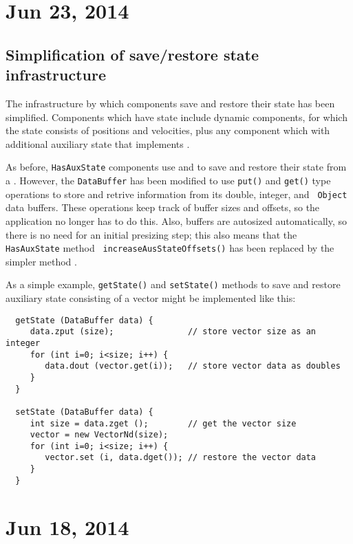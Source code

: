 \documentclass{article}
\begin{document}
\section*{Jun 23, 2014}

\subsection*{Simplification of save/restore state infrastructure}

The infrastructure by which components save and restore their state
has been simplified. Components which have state include dynamic
components, for which the state consists of positions and velocities,
plus any component which with additional auxiliary state that
implements .

As before, {\tt HasAuxState} components use
 and
 to save
and restore their state from a
. However, the {\tt DataBuffer}
has been modified to use {\tt put()} and {\tt get()} type operations
to store and retrive information from its double, integer, and {\tt
Object} data buffers. These operations keep track of buffer sizes and
offsets, so the application no longer has to do this. Also, buffers
are autosized automatically, so there is no need for an initial
presizing step; this also means that the {\tt HasAuxState} method {\tt
increaseAusStateOffsets()} has been replaced by the simpler method
.

As a simple example, {\tt getState()} and {\tt setState()} methods to
save and restore auxiliary state consisting of a vector might be
implemented like this:
\begin{lstlisting}
  getState (DataBuffer data) {
     data.zput (size);               // store vector size as an integer
     for (int i=0; i<size; i++) {
        data.dout (vector.get(i));   // store vector data as doubles
     }
  }

  setState (DataBuffer data) {
     int size = data.zget ();        // get the vector size
     vector = new VectorNd(size);
     for (int i=0; i<size; i++) {
        vector.set (i, data.dget()); // restore the vector data
     }
  }
\end{lstlisting}

\section*{Jun 18, 2014}
\end{document}
